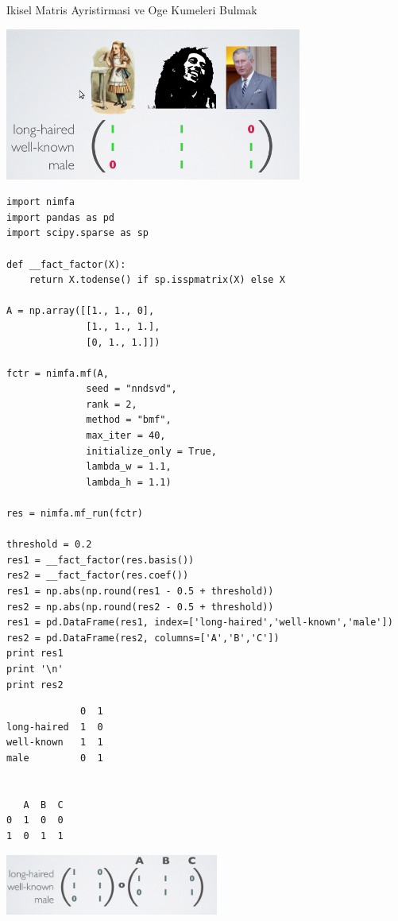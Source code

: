 \documentclass[12pt,fleqn]{article}\usepackage{../common}
\begin{document}
Ikisel Matris Ayristirmasi ve Oge Kumeleri Bulmak

\includegraphics[height=5cm]{abc.png}

\begin{verbatim}
import nimfa
import pandas as pd
import scipy.sparse as sp

def __fact_factor(X):
    return X.todense() if sp.isspmatrix(X) else X

A = np.array([[1., 1., 0],
              [1., 1., 1.],
              [0, 1., 1.]])

fctr = nimfa.mf(A,
              seed = "nndsvd", 
              rank = 2, 
              method = "bmf", 
              max_iter = 40, 
              initialize_only = True,
              lambda_w = 1.1,
              lambda_h = 1.1)

res = nimfa.mf_run(fctr)

threshold = 0.2
res1 = __fact_factor(res.basis())
res2 = __fact_factor(res.coef())
res1 = np.abs(np.round(res1 - 0.5 + threshold))
res2 = np.abs(np.round(res2 - 0.5 + threshold))
res1 = pd.DataFrame(res1, index=['long-haired','well-known','male'])
res2 = pd.DataFrame(res2, columns=['A','B','C'])
print res1
print '\n'
print res2
\end{verbatim}

\begin{verbatim}
             0  1
long-haired  1  0
well-known   1  1
male         0  1


   A  B  C
0  1  0  0
1  0  1  1
\end{verbatim}

\includegraphics[height=2cm]{abc_res.png}
\end{document}
